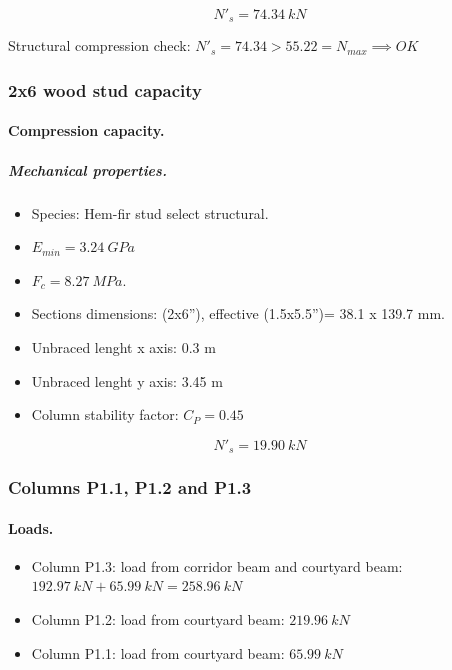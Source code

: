 \begin{equation}
  N'_s= 74.34\ kN
\end{equation}

\noindent Structural compression check: $N'_s = 74.34 > 55.22 = N_{max} \implies OK$

\subsubsection{2x6 wood stud capacity}

\paragraph{Compression capacity.}

\subparagraph{Mechanical properties.}

\begin{itemize}
\item Species: Hem-fir stud select structural.
\item $E_{min}= 3.24\ GPa$
\item $F_c= 8.27\ MPa$.
\item Sections dimensions: (2x6''), effective (1.5x5.5'')= 38.1 x 139.7  mm.
\item Unbraced lenght x axis: 0.3 m
\item Unbraced lenght y axis: 3.45 m
\item Column stability factor: $C_P= 0.45$
\end{itemize}

\begin{equation}
  N'_s= 19.90\ kN
\end{equation}


\subsubsection{Columns P1.1, P1.2 and P1.3}

\paragraph{Loads.}

\begin{itemize}
\item Column P1.3: load from corridor beam and courtyard beam: $192.97\ kN + 65.99\ kN= 258.96\ kN$
\item Column P1.2: load from courtyard beam: $219.96\ kN$
\item Column P1.1: load from courtyard beam: $65.99\ kN$
\end{itemize}

